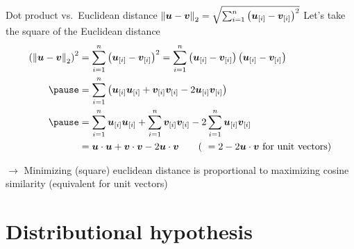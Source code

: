 \documentclass[12pt,aspectratio=169,handout]{beamer}
\begin{document}
\begin{frame}{Dot product vs.\ Euclidean distance $\norm{\bm{u} - \bm{v}}_{2} = \sqrt{\sum_{i = 1}^{n} \left( \bm{u}_{[i]} - \bm{v}_{[i]} \right)^2}$}
Let's take the square of the Euclidean distance
	$$
	\begin{aligned}
		\left(\norm{\bm{u} - \bm{v}}_{2}\right)^2 &=
		\sum_{i = 1}^{n} \left( \bm{u}_{[i]} - \bm{v}_{[i]} \right)^2 
		=
		\sum_{i = 1}^{n} \left( \bm{u}_{[i]} - \bm{v}_{[i]} \right) \left( \bm{u}_{[i]} - \bm{v}_{[i]} \right) \\ \pause
		&=
		\sum_{i = 1}^{n} \left( \bm{u}_{[i]} \bm{u}_{[i]} + \bm{v}_{[i]} \bm{v}_{[i]} - 2 \bm{u}_{[i]} \bm{v}_{[i]} \right)  \\ \pause
		&= \sum_{i = 1}^{n}  \bm{u}_{[i]} \bm{u}_{[i]} + \sum_{i = 1}^{n} \bm{v}_{[i]} \bm{v}_{[i]} - 2 \sum_{i = 1}^{n} \bm{u}_{[i]} \bm{v}_{[i]} \\
		&= \bm{u} \cdot \bm{u} + \bm{v} \cdot \bm{v} - 2 \bm{u} \cdot \bm{v} \qquad
		\text{( } = 2 - 2 \bm{u} \cdot \bm{v} \text{ for unit vectors)}\\
	\end{aligned}
	$$
	
	\pause
	
$\to$ Minimizing (square) euclidean distance is proportional to maximizing cosine similarity (equivalent for unit vectors)

	
	
\end{frame}


\section{Distributional hypothesis}
\end{document}
